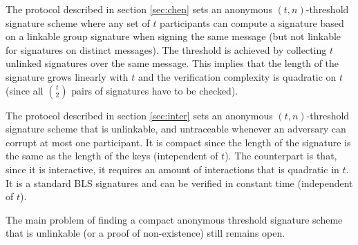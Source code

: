 The protocol described in section \ref{sec:chen} sets an anonymous $(t,n)$-threshold signature scheme where any set of $t$ participants can compute a signature based on a linkable group signature when signing the same message (but not linkable for signatures on distinct messages). The threshold is achieved by collecting $t$ unlinked signatures over the same message. This implies that the length of the signature grows linearly with $t$ and the verification complexity is quadratic on $t$ (since all $\binom{t}{2}$ pairs of signatures have to be checked).

The protocol described in section \ref{sec:inter} sets an anonymous $(t,n)$-threshold signature scheme that is unlinkable, and untraceable whenever an adversary can corrupt at most one participant. It is compact since the length of the signature is the same as the length of the keys (intependent of $t$). The counterpart is that, since it is interactive, it requires an amount of interactions that is quadratic in $t$. It is a standard BLS signatures and can be verified in constant time (independent of $t$).

The main problem of finding a compact anonymous threshold signature scheme that is unlinkable (or a proof of non-existence) still remains open.